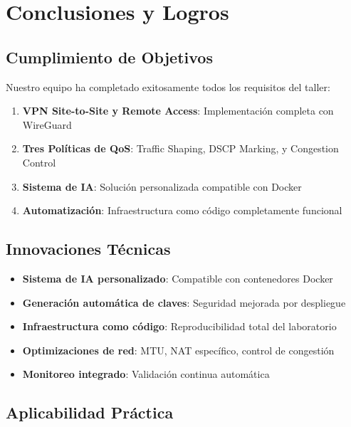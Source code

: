 \section{Conclusiones y Logros}

\subsection{Cumplimiento de Objetivos}

Nuestro equipo ha completado exitosamente todos los requisitos del taller:

\begin{enumerate}
    \item \textbf{VPN Site-to-Site y Remote Access}: Implementación completa con WireGuard
    \item \textbf{Tres Políticas de QoS}: Traffic Shaping, DSCP Marking, y Congestion Control
    \item \textbf{Sistema de IA}: Solución personalizada compatible con Docker
    \item \textbf{Automatización}: Infraestructura como código completamente funcional
\end{enumerate}

\subsection{Innovaciones Técnicas}

\begin{destacado}
\begin{itemize}
    \item \textbf{Sistema de IA personalizado}: Compatible con contenedores Docker
    \item \textbf{Generación automática de claves}: Seguridad mejorada por despliegue
    \item \textbf{Infraestructura como código}: Reproducibilidad total del laboratorio
    \item \textbf{Optimizaciones de red}: MTU, NAT específico, control de congestión
    \item \textbf{Monitoreo integrado}: Validación continua automática
\end{itemize}
\end{destacado}

\subsection{Aplicabilidad Práctica}

